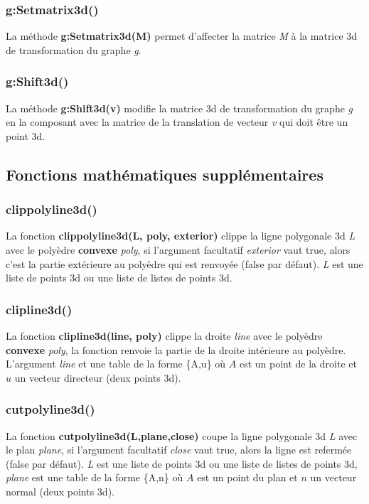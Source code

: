 \documentclass[%
10pt,%
a4paper,%
french,%
]%
{article}%
\begin{document}
\subsubsection{g:Setmatrix3d()}
La méthode \textbf{g:Setmatrix3d(M)} permet d'affecter la matrice \emph M à la matrice 3d de transformation du graphe \emph g.

\subsubsection{g:Shift3d()}
La méthode \textbf{g:Shift3d(v)} modifie la matrice 3d de transformation du graphe \emph g en la composant avec la matrice de la translation de vecteur \emph{v} qui doit être un point 3d.

\subsection{Fonctions mathématiques supplémentaires}

\subsubsection{clippolyline3d()}
La fonction \textbf{clippolyline3d(L, poly, exterior)} clippe la ligne polygonale 3d \emph{L} avec le polyèdre \textbf{convexe} \emph{poly}, si l'argument facultatif \emph{exterior} vaut true, alors c'est la partie extérieure au polyèdre qui est renvoyée (false par défaut). \emph{L} est une liste de points 3d ou une liste de listes de points 3d.

\subsubsection{clipline3d()}
La fonction \textbf{clipline3d(line, poly)} clippe la droite \emph{line} avec le polyèdre \textbf{convexe} \emph{poly}, la fonction renvoie la partie de la droite intérieure au polyèdre. L'argument \emph{line} et une table de la forme \{A,u\} où $A$ est un point de la droite et $u$ un vecteur directeur (deux points 3d).

\subsubsection{cutpolyline3d()}
La fonction \textbf{cutpolyline3d(L,plane,close)} coupe la ligne polygonale 3d \emph{L} avec le plan \emph{plane}, si l'argument facultatif \emph{close} vaut true, alors la ligne est refermée (false par défaut).
\emph{L} est une liste de points 3d ou une liste de listes de points 3d, \emph{plane} est une table de la forme \{A,n\} où $A$ est un point du plan et $n$ un vecteur normal (deux points 3d).
\end{document}
